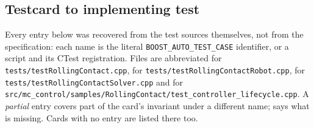 \documentclass[10pt]{article}
\begin{document}
\subsection{Testcard to implementing test}
\label{sec:test-traceability-map}

Every entry below was recovered from the test sources themselves, not from the
specification: each name is the literal \texttt{BOOST\_AUTO\_TEST\_CASE}
identifier, or a script and its CTest registration. Files are abbreviated
 for \texttt{tests/testRollingContact.cpp},  for
\texttt{tests/testRollingContactRobot.cpp},  for
\texttt{tests/testRollingContactSolver.cpp} and  for
\texttt{src/mc\_control/samples/RollingContact/test\_controller\_lifecycle.cpp}.
A \emph{partial} entry covers part of the card's invariant under a different
name;  says what is missing. Cards with no entry are
listed there too.
\end{document}
